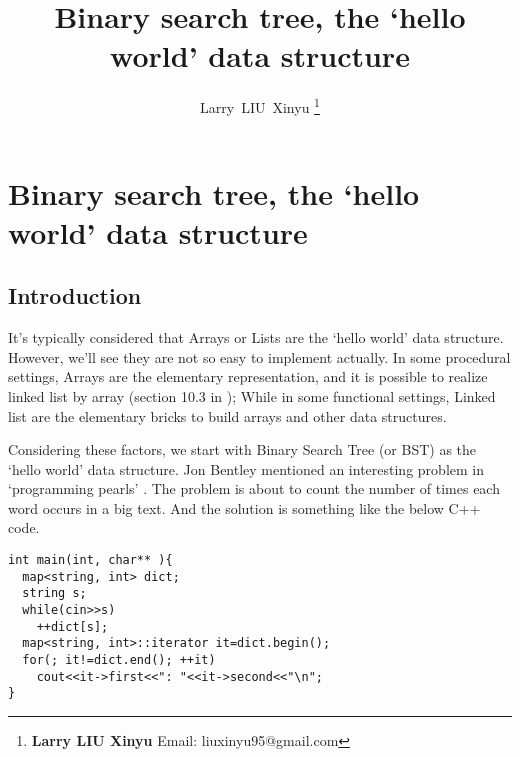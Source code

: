 \documentclass{article}
\begin{document}


\title{Binary search tree, the `hello world' data structure}

\author{Larry~LIU~Xinyu
\thanks{{\bfseries Larry LIU Xinyu } \newline
  Email: liuxinyu95@gmail.com \newline}
  }

\maketitle
\fi


\ifx\wholebook\relax
\chapter{Binary search tree, the `hello world' data structure}
\fi

\section{Introduction}
\label{introduction} 

It's typically considered that Arrays or Lists are the `hello world' data structure.
However, we'll see they are not so easy to implement actually. In some procedural
settings, Arrays are the elementary representation, and it is possible to realize
linked list by array (section 10.3 in \cite{CLRS}); While in some functional settings,
Linked list are the elementary bricks to build arrays and other data structures.

Considering these factors, we start with Binary Search Tree (or BST) as the `hello world'
data structure. Jon Bentley mentioned an interesting problem in `programming pearls'
\cite{Bentley}. The problem is about to count the number of times each word occurs
in a big text. And the solution is something like the below C++ code.

\lstset{language=C++}
\begin{lstlisting}
int main(int, char** ){
  map<string, int> dict;
  string s;
  while(cin>>s)
    ++dict[s];
  map<string, int>::iterator it=dict.begin();
  for(; it!=dict.end(); ++it)
    cout<<it->first<<": "<<it->second<<"\n";
}
\end{lstlisting}
\end{document}
